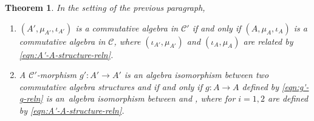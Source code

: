\documentclass[pdftex]{sigma}
\numberwithin{equation}{section}
\newtheorem{Theorem}{Theorem}[section]
\theoremstyle{definition}
\begin{document}
\begin{Theorem}\label{thm:C'-alg-to-C-alg}
In the setting of the previous paragraph,
\begin{enumerate}\itemsep=0pt
\item[$(1)$] $(A',\mu_{A'},\iota_{A'})$ is a commutative algebra in $\mathcal{C}'$ if and only if $(A,\mu_A,\iota_A)$ is a commutative algebra in $\mathcal{C}$, where $(\iota_{A'},\mu_{A'})$ and $(\iota_A,\mu_A)$ are related by \eqref{eqn:A'-A-structure-reln}.

\item[$(2)$] A $\mathcal{C}'$-morphism $g'\colon A'\rightarrow A'$ is an algebra isomorphism between two commutative algebra structures  and  if and only if $g\colon A\rightarrow A$ defined by \eqref{eqn:g'-g-reln} is an~algebra isomorphism between  and , where  for $i=1,2$ are defined by \eqref{eqn:A'-A-structure-reln}.
\end{enumerate}
\end{Theorem}
\end{document}
